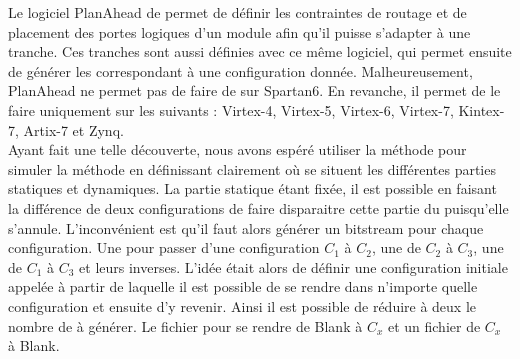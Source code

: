 Le logiciel PlanAhead de  permet de définir les contraintes de routage et de placement des portes logiques d'un module afin qu'il puisse s'adapter à une tranche. Ces tranches sont aussi définies avec ce même logiciel, qui permet ensuite de générer les  correspondant à une configuration donnée. Malheureusement, PlanAhead ne permet pas de faire de  sur Spartan6. En revanche, il permet de le faire uniquement sur les \fpgas{} suivants : Virtex-4, Virtex-5, Virtex-6, Virtex-7, Kintex-7, Artix-7 et Zynq.\\

Ayant fait une telle découverte, nous avons espéré utiliser la méthode  pour simuler la méthode  en définissant clairement où se situent les différentes parties statiques et dynamiques. La partie statique étant fixée, il est possible en faisant la différence de deux configurations de faire disparaitre cette partie du  puisqu'elle s'annule. L'inconvénient est qu'il faut alors générer un bitstream pour chaque configuration. Une pour passer d'une configuration $C_{1}$ à $C_{2}$, une de $C_{2}$ à $C_{3}$, une de $C_{1}$ à $C_{3}$ et leurs inverses. L'idée était alors de définir une configuration initiale appelée  à partir de laquelle il est possible de se rendre dans n'importe quelle configuration et ensuite d'y revenir. Ainsi il est possible de réduire à deux le nombre de  à générer. Le fichier pour se rendre de Blank à $C_{x}$ et un fichier de $C_{x}$ à Blank.
